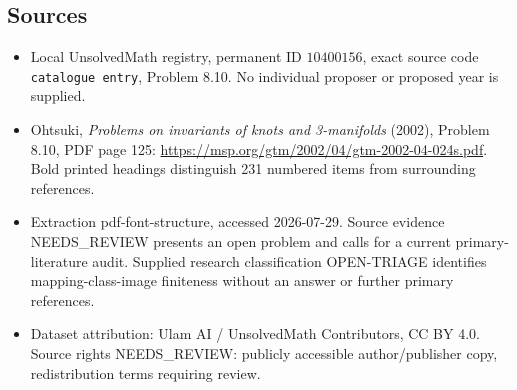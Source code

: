 \documentclass[11pt]{article}
\begin{document}
\subsection{Sources}
\begin{itemize}
\item Local UnsolvedMath registry, permanent ID \(10400156\), exact source code \texttt{catalogue entry}, Problem 8.10. No individual proposer or proposed year is supplied.
\item Ohtsuki, \emph{Problems on invariants of knots and 3-manifolds} (2002), Problem 8.10, PDF page 125: \url{https://msp.org/gtm/2002/04/gtm-2002-04-024s.pdf}. Bold printed headings distinguish 231 numbered items from surrounding references.
\item Extraction pdf-font-structure, accessed 2026-07-29. Source evidence NEEDS\_REVIEW presents an open problem and calls for a current primary-literature audit. Supplied research classification OPEN-TRIAGE identifies mapping-class-image finiteness without an answer or further primary references.
\item Dataset attribution: Ulam AI / UnsolvedMath Contributors, CC BY 4.0. Source rights NEEDS\_REVIEW: publicly accessible author/publisher copy, redistribution terms requiring review.
\end{itemize}
\end{document}
